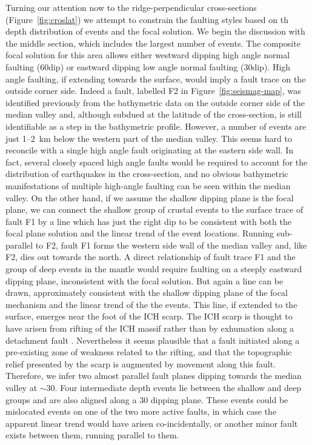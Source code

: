 \documentclass[jgr]{aguplus}
\newlength{\tw}
\begin{document}
\begin{article}
Turning our attention now to the ridge-perpendicular cross-sections
(Figure~\ref{fig:croslat}) we  attempt to constrain the faulting
styles based on th depth distribution of events and the focal solution.
We begin the discussion with the middle section, which includes the
largest number of events.  The composite focal solution for this area
allows either westward dipping high angle normal faulting (60\dg dip)
or eastward dipping low angle normal faulting (30\dg dip).  High angle
faulting, if extending towards the surface, would imply a fault trace
on the outside corner side.  Indeed a fault,
labelled F2 in Figure~\ref{fig:seismag-map}, was identified previously
from the
bathymetric data on the outside corner side of the median valley
\citep{reston02} and, although subdued at the latitude of the
cross-section, is still identifiable as a step in the bathymetric
profile. However, a number of events are just 1--2~km below the
western part of the median valley. This seems hard to reconcile with a
single high angle fault originating at the eastern side wall.  In
fact, several closely spaced high angle faults would be required to account
for the distribution of earthquakes in the cross-section, and no
obvious bathymetric manifestations of multiple high-angle faulting
can be seen within the median valley.  On the other hand, if we assume
the shallow dipping plane is the focal plane, we can connect the
shallow group of crustal events to the surface trace of fault F1
by a line which has just the right dip to be consistent with both the focal
plane solution and the linear trend of the event locations. Running
sub-parallel to F2, fault F1 forms the western side wall of the median
valley \citep{reston02} and, like F2, dies out towards the north.  A
direct relationship of fault trace F1 and the group of deep events in
the mantle would require faulting on a steeply eastward dipping
plane, inconsistent with the focal solution.  But again a line can be
drawn, approximately consistent with the shallow dipping plane of the
focal mechanism and the linear trend of the the events. This line, if
extended to the surface, emerges near the foot of the ICH scarp.  The
ICH scarp is thought to have arisen from rifting of the ICH massif
rather than by exhumation along a detachment fault
\citep{reston02}.  Nevertheless it seems plausible that a fault
initiated along a pre-existing zone of weakness related to the
rifting, and that the topographic relief presented by the scarp is
augmented by movement along this fault. Therefore, we infer two almost
parallel fault planes dipping towards the median valley at $\sim$30\dg.
Four intermediate depth events
lie between the shallow and deep groups and are also aligned along a
30{\dg} dipping plane.  These events could be mislocated events on one
of the two more active faults, in
which case the apparent linear trend would have arisen
co-incidentally, or another minor fault exists between them, running parallel to them.


\end{article}
\end{document}
